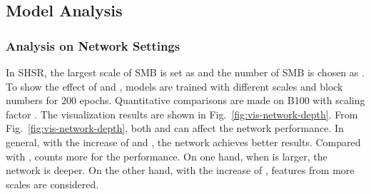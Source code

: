 \documentclass[manuscript,screen]{acmart}
\begin{document}
\subsection{Model Analysis}
\subsubsection{Analysis on Network Settings}
In SHSR, the largest scale of SMB is set as  and the number of SMB is chosen as . To show the effect of  and , models are trained with different scales and block numbers for 200 epochs. Quantitative comparisons are made on B100 with scaling factor . The visualization results are shown in Fig.~\ref{fig:vis-network-depth}. From Fig.~\ref{fig:vis-network-depth}, both  and  can affect the network performance. In general, with the increase of  and , the network achieves better results. Compared with ,  counts more for the performance. On one hand, when  is larger, the network is deeper. On the other hand, with the increase of , features from more scales are considered.
\end{document}
